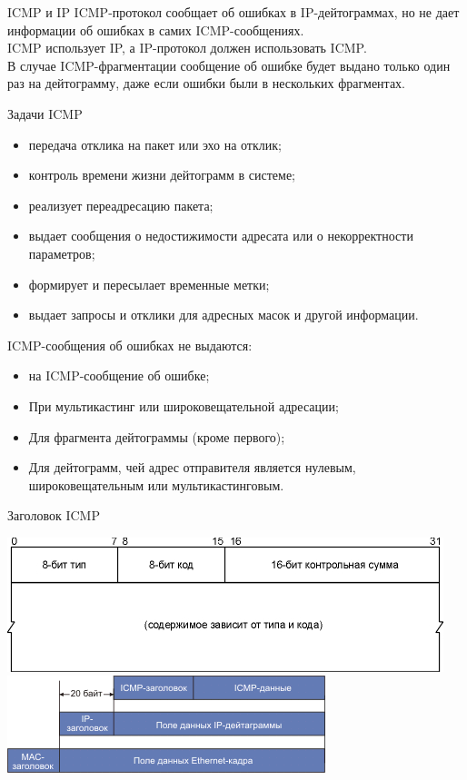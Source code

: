 \begin{frame}{ICMP и IP}
	ICMP-протокол сообщает об ошибках в IP-дейтограммах,  но не дает информации об ошибках в самих ICMP-сообщениях.\\
	\pause
	\bigskip
	ICMP использует IP,  а IP-протокол должен использовать ICMP.\\
	\pause
	\bigskip
	В случае ICMP-фрагментации сообщение об ошибке будет выдано только один раз на дейтограмму,  даже если ошибки были в нескольких фрагментах.	
\end{frame}

\begin{frame}{Задачи ICMP}
	\begin{itemize}
		\item передача отклика на пакет или эхо на отклик;
		\item контроль времени жизни дейтограмм в системе;
		\item реализует переадресацию пакета;
		\item выдает сообщения о недостижимости адресата или о некорректности параметров;
		\item формирует и пересылает временные метки;
		\item выдает запросы и отклики для адресных масок и другой информации.
	\end{itemize}
\end{frame}

\begin{frame}
ICMP-сообщения об ошибках не выдаются:
	\begin{itemize}
		\item на ICMP-сообщение об ошибке;
		\item При мультикастинг или широковещательной адресации;
		\item Для фрагмента дейтограммы (кроме первого);
		\item Для дейтограмм,  чей адрес отправителя является нулевым,  широковещательным или мультикастинговым.
	\end{itemize}
\end{frame}

\begin{frame}{Заголовок ICMP}
	\begin{center}
		\includegraphics[height=0.4\textheight]{03-icmp_header.png}\\
		\pause
		\bigskip
		\includegraphics[height=0.4\textheight]{03-icmp_incapsulation.png}
	\end{center}
\end{frame}

